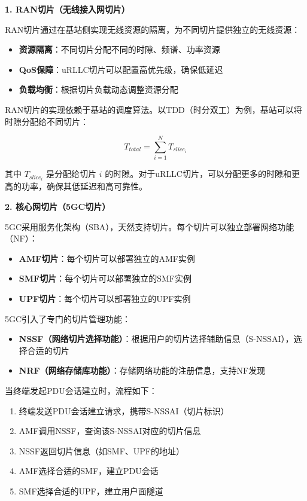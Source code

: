 \textbf{1. RAN切片（无线接入网切片）}

RAN切片通过在基站侧实现无线资源的隔离，为不同切片提供独立的无线资源：

\begin{itemize}
    \item \textbf{资源隔离}：不同切片分配不同的时隙、频谱、功率资源
    \item \textbf{QoS保障}：uRLLC切片可以配置高优先级，确保低延迟
    \item \textbf{负载均衡}：根据切片负载动态调整资源分配
\end{itemize}

RAN切片的实现依赖于基站的调度算法。以TDD（时分双工）为例，基站可以将时隙分配给不同切片：

\begin{equation}
T_{total} = \sum_{i=1}^{N} T_{slice_i}
\end{equation}

其中 $T_{slice_i}$ 是分配给切片 $i$ 的时隙。对于uRLLC切片，可以分配更多的时隙和更高的功率，确保其低延迟和高可靠性。

\textbf{2. 核心网切片（5GC切片）}

5GC采用服务化架构（SBA），天然支持切片。每个切片可以独立部署网络功能（NF）：

\begin{itemize}
    \item \textbf{AMF切片}：每个切片可以部署独立的AMF实例
    \item \textbf{SMF切片}：每个切片可以部署独立的SMF实例
    \item \textbf{UPF切片}：每个切片可以部署独立的UPF实例
\end{itemize}

5GC引入了专门的切片管理功能：

\begin{itemize}
    \item \textbf{NSSF（网络切片选择功能）}：根据用户的切片选择辅助信息（S-NSSAI），选择合适的切片
    \item \textbf{NRF（网络存储库功能）}：存储网络功能的注册信息，支持NF发现
\end{itemize}

当终端发起PDU会话建立时，流程如下：

\begin{enumerate}
    \item 终端发送PDU会话建立请求，携带S-NSSAI（切片标识）
    \item AMF调用NSSF，查询该S-NSSAI对应的切片信息
    \item NSSF返回切片信息（如SMF、UPF的地址）
    \item AMF选择合适的SMF，建立PDU会话
    \item SMF选择合适的UPF，建立用户面隧道
\end{enumerate}

